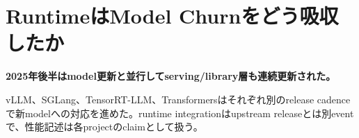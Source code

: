 \section{RuntimeはModel Churnをどう吸収したか}
\label{pkg:runtime}
\noindent\textbf{2025年後半はmodel更新と並行してserving/library層も連続更新された。}\autocite{src-43eaa2f12960,src-455a78bc36fa,src-58ef6e84aa65}

vLLM、SGLang、TensorRT-LLM、Transformersはそれぞれ別のrelease cadenceで新modelへの対応を進めた。runtime integrationはupstream releaseとは別eventで、性能記述は各projectのclaimとして扱う。\autocite{src-04b5c0f10b59,src-2595cdd4fabc,src-283a52c58291,src-4197b73cea93,src-43eaa2f12960,src-455a78bc36fa,src-58ef6e84aa65,src-a783d282600b,src-d4b1979540fd,src-ee0eb9562688}
